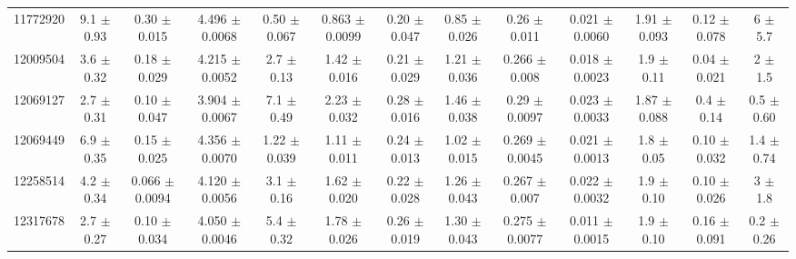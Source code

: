 \begin{table}[H]
\begin{tabular}{c|cccccc|cccccc}
11772920 &        9.1    $\pm$  0.93   &      0.30   $\pm$  0.015  &      4.496  $\pm$  0.0068 &      0.50   $\pm$  0.067  &      0.863  $\pm$  0.0099 &      0.20   $\pm$  0.047    &        0.85   $\pm$  0.026    &        0.26   $\pm$  0.011    &        0.021  $\pm$  0.0060   &        1.91   $\pm$  0.093    &        0.12   $\pm$  0.078    &        6      $\pm$  5.7      \\
12009504 &        3.6    $\pm$  0.32   &      0.18   $\pm$  0.029  &      4.215  $\pm$  0.0052 &      2.7    $\pm$  0.13   &      1.42   $\pm$  0.016  &      0.21   $\pm$  0.029    &        1.21   $\pm$  0.036    &        0.266  $\pm$  0.008    &        0.018  $\pm$  0.0023   &        1.9    $\pm$  0.11     &        0.04   $\pm$  0.021    &        2      $\pm$  1.5      \\
12069127 &        2.7    $\pm$  0.31   &      0.10   $\pm$  0.047  &      3.904  $\pm$  0.0067 &      7.1    $\pm$  0.49   &      2.23   $\pm$  0.032  &      0.28   $\pm$  0.016    &        1.46   $\pm$  0.038    &        0.29   $\pm$  0.0097   &        0.023  $\pm$  0.0033   &        1.87   $\pm$  0.088    &        0.4    $\pm$  0.14     &        0.5    $\pm$  0.60     \\
12069449 &        6.9    $\pm$  0.35   &      0.15   $\pm$  0.025  &      4.356  $\pm$  0.0070 &      1.22   $\pm$  0.039  &      1.11   $\pm$  0.011  &      0.24   $\pm$  0.013    &        1.02   $\pm$  0.015    &        0.269  $\pm$  0.0045   &        0.021  $\pm$  0.0013   &        1.8    $\pm$  0.05     &        0.10   $\pm$  0.032    &        1.4    $\pm$  0.74     \\
12258514 &        4.2    $\pm$  0.34   &      0.066  $\pm$  0.0094 &      4.120  $\pm$  0.0056 &      3.1    $\pm$  0.16   &      1.62   $\pm$  0.020  &      0.22   $\pm$  0.028    &        1.26   $\pm$  0.043    &        0.267  $\pm$  0.007    &        0.022  $\pm$  0.0032   &        1.9    $\pm$  0.10     &        0.10   $\pm$  0.026    &        3      $\pm$  1.8      \\
12317678 &        2.7    $\pm$  0.27   &      0.10   $\pm$  0.034  &      4.050  $\pm$  0.0046 &      5.4    $\pm$  0.32   &      1.78   $\pm$  0.026  &      0.26   $\pm$  0.019    &        1.30   $\pm$  0.043    &        0.275  $\pm$  0.0077   &        0.011  $\pm$  0.0015   &        1.9    $\pm$  0.10     &        0.16   $\pm$  0.091    &        0.2    $\pm$  0.26     \\

\end{tabular}
\end{table}
